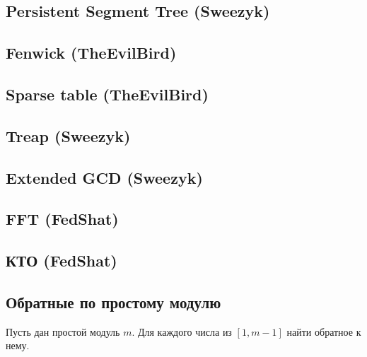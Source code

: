 \documentclass[a4paper]{article}
\begin{document}
\begin{multicols*}{2}
        \subsection{Persistent Segment Tree (Sweezyk)}
            
            
        \subsection{Fenwick (TheEvilBird)}
            
        
        \subsection{Sparse table (TheEvilBird)}
            
        
        \subsection{Treap (Sweezyk)}
            
        
        \subsection{Extended GCD (Sweezyk)}
            
        
        \subsection{FFT (FedShat)}
            
        
        \subsection{КТО (FedShat)}
            
        
        \subsection{Обратные по простому модулю}
            Пусть дан простой модуль $m$. Для каждого числа из $[1, m - 1]$ найти обратное к нему.
            
        

\end{multicols*}
\end{document}
